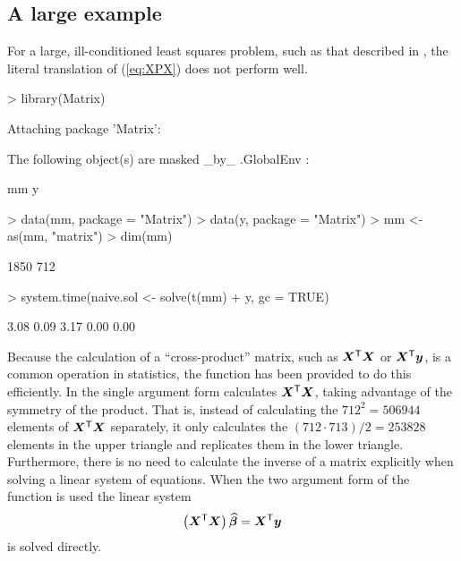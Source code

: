 \documentclass{article}
\begin{document}
\subsection{A large example}
\label{sec:largeLSQ}

For a large, ill-conditioned least squares problem, such as that
described in \citet{koen:ng:2003}, the literal translation of
(\ref{eq:XPX}) does not perform well.
\begin{Schunk}
\begin{Sinput}
> library(Matrix)
\end{Sinput}
\begin{Soutput}
Attaching package 'Matrix':


	The following object(s) are masked _by_ .GlobalEnv :

	 mm y 
\end{Soutput}
\begin{Sinput}
> data(mm, package = "Matrix")
> data(y, package = "Matrix")
> mm <- as(mm, "matrix")
> dim(mm)
\end{Sinput}
\begin{Soutput}
[1] 1850  712
\end{Soutput}
\begin{Sinput}
> system.time(naive.sol <- solve(t(mm) %*% mm) %*% t(mm) %*% 
+     y, gc = TRUE)
\end{Sinput}
\begin{Soutput}
[1] 3.08 0.09 3.17 0.00 0.00
\end{Soutput}
\end{Schunk}

Because the calculation of a ``cross-product'' matrix, such as
$\bm{X}^\mathsf{T}\bm{X}$ or $\bm{X}^\mathsf{T}\bm{y}$, is a common operation in
statistics, the  function has been provided to do
this efficiently.  In the single argument form 
calculates $\bm{X}^\mathsf{T}\bm{X}$, taking advantage of the symmetry of the
product.  That is, instead of calculating the $712^2=506944$ elements of
$\bm{X}^\mathsf{T}\bm{X}$ separately, it only calculates the $(712\cdot
713)/2=253828$ elements in the upper triangle and replicates them in
the lower triangle. Furthermore, there is no need to calculate the
inverse of a matrix explicitly when solving a
linear system of equations.  When the two argument form of the 
function is used the linear system
\begin{equation}
  \label{eq:LSQsol}
  \left(\bm{X}^\mathsf{T}\bm{X}\right) \widehat{\bm{\beta}} = \bm{X}^\mathsf{T}\bm{y}
\end{equation}
is solved directly.
\end{document}
